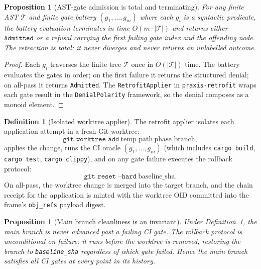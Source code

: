 \documentclass[11pt,oneside]{book}
\theoremstyle{definition}
\newtheorem{definition}{Definition}[chapter]
\theoremstyle{plain}
\newtheorem{proposition}[theorem]{Proposition}
\theoremstyle{remark}
\newcommand{\code}[1]{\texttt{#1}}
\begin{document}
\begin{proposition}[AST-gate admission is total and terminating]\label{prop:astterm}
For any finite AST $\mathcal{T}$ and finite gate battery $(g_1,\dots,g_m)$ where each $g_i$ is a syntactic predicate, the battery evaluation terminates in time $O(m\cdot|\mathcal{T}|)$ and returns either $\code{Admitted}$ or a refusal carrying the first failing gate index and the offending node. %
The retraction is total: it never diverges and never returns an unlabelled outcome. %
\end{proposition}

\begin{proof}
Each $g_i$ traverses the finite tree $\mathcal{T}$ once in $O(|\mathcal{T}|)$ time. %
The battery evaluates the gates in order; on the first failure it returns the structured denial; on all-pass it returns \code{Admitted}. %
The \code{RetrofitApplier} in \code{praxis-retrofit} wraps each gate result in the \code{DenialPolarity} framework, so the denial composes as a monoid element. %
\end{proof}

\begin{definition}[Isolated worktree applier]\label{def:worktree-ret}
The retrofit applier isolates each application attempt in a fresh Git worktree:
\begin{equation}\label{eq:worktree}
\code{git worktree add}\ \text{temp\_path}\ \text{phase\_branch},
\end{equation}
applies the change, runs the CI oracle $(g_1,\dots,g_m)$ (which includes \code{cargo build}, \code{cargo test}, \code{cargo clippy}), and on any gate failure executes the rollback protocol:
\[
\code{git reset --hard}\ \text{baseline\_sha}.
\]
On all-pass, the worktree change is merged into the target branch, and the chain receipt for the application is minted with the worktree OID committed into the frame's \code{obj\_refs} payload digest. %
\end{definition}

\begin{proposition}[Main branch cleanliness is an invariant]\label{prop:mainclean}
Under Definition~\ref{def:worktree-ret}, the main branch is never advanced past a failing CI gate. %
The rollback protocol is unconditional on failure: it runs before the worktree is removed, restoring the branch to \code{baseline\_sha} regardless of which gate failed. %
Hence the main branch satisfies all CI gates at every point in its history. %
\end{proposition}
\end{document}
